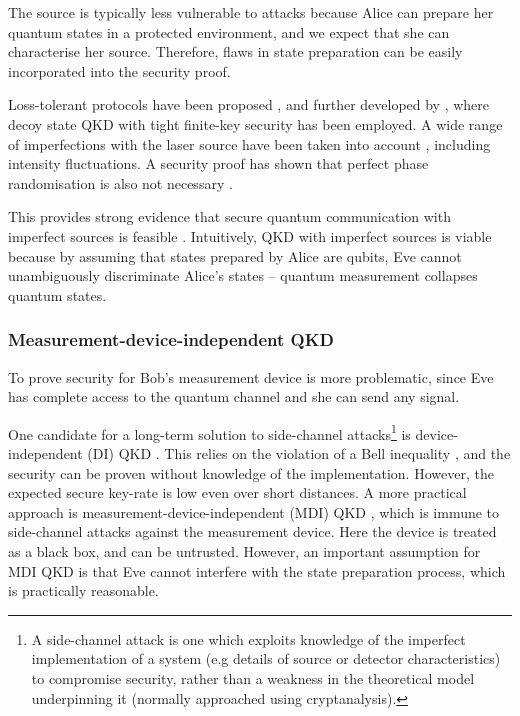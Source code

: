 The source is typically less vulnerable to attacks because Alice can prepare her quantum states in a protected environment, and we expect that she can characterise her source. Therefore, flaws in state preparation can be easily incorporated into the security proof.

Loss-tolerant protocols have been proposed \cite{bib:PhysRevA.90.052314}, and further developed by \cite{bib:PhysRevA.92.032305}, where decoy state QKD with tight finite-key security has been employed. A wide range of imperfections with the laser source have been taken into account \cite{bib:mizutani2015finite}, including intensity fluctuations. A security proof has shown that perfect phase randomisation is also not necessary \cite{bib:cao2015discrete}.

This provides strong evidence that secure quantum communication with imperfect sources is feasible \cite{bib:diamanti2016practical}. Intuitively, QKD with imperfect sources is viable because by assuming that states prepared by Alice are qubits, Eve cannot unambiguously discriminate Alice's states \cite{bib:diamanti2016practical} -- quantum measurement collapses quantum states. 

\subsubsection{Measurement-device-independent QKD}

To prove security for Bob's measurement device is more problematic, since Eve has complete access to the quantum channel and she can send any signal. 

One candidate for a long-term solution to side-channel attacks\footnote{A side-channel attack is one which exploits knowledge of the imperfect implementation of a system (e.g details of source or detector characteristics) to compromise security, rather than a weakness in the theoretical model underpinning it (normally approached using cryptanalysis).} is device-independent (DI) QKD \cite{bib:PhysRevLett.98.230501}. This relies on the violation of a Bell inequality \cite{bib:hensen2015loophole}, and the security can be proven without knowledge of the implementation. However, the expected secure key-rate is low even over short distances. A more practical approach is measurement-device-independent (MDI) QKD \cite{bib:PhysRevLett.108.130503}, which is immune to side-channel attacks against the measurement device. Here the device is treated as a black box, and can be untrusted. However, an important assumption for MDI QKD is that Eve cannot interfere with the state preparation process, which is practically reasonable. 

